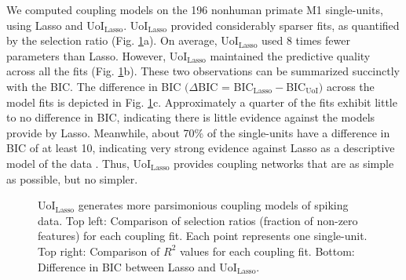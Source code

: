 \documentclass[letterpaper, 10 pt, conference]{ieeeconf}  %
\begin{document}
We computed coupling models on the 196 nonhuman primate M1 single-units, using  Lasso and UoI$_{\text{Lasso}}$. UoI$_{\text{Lasso}}$ provided considerably sparser fits, as quantified by the selection ratio (Fig. \ref{fig:nhp}a). On average, UoI$_{\text{Lasso}}$ used 8 times fewer parameters than Lasso. However, UoI$_{\text{Lasso}}$ maintained the predictive quality across all the fits (Fig. \ref{fig:nhp}b). These two observations can be summarized succinctly with the BIC. The difference in BIC $(\Delta$BIC = BIC$_{\text{Lasso}}-$BIC$_{\text{UoI}})$ across the model fits is depicted in Fig. \ref{fig:nhp}c. Approximately a quarter of the fits exhibit little to no difference in BIC, indicating there is little evidence against the models provide by Lasso.  Meanwhile, about 70\% of the single-units have a difference in BIC of at least 10, indicating very strong evidence against Lasso as a descriptive model of the data \cite{kass1995}. Thus, UoI$_{\text{Lasso}}$ provides coupling networks that are as simple as possible, but no simpler. 
\begin{figure}[t]
    \centering
    \vspace{-15pt}
    \caption{UoI$_{\text{Lasso}}$ generates more parsimonious coupling models of spiking data. Top left: Comparison of selection ratios (fraction of non-zero features) for each coupling fit. Each point represents one single-unit. Top right: Comparison of $R^2$ values for each coupling fit. Bottom: Difference in BIC between Lasso and UoI$_{\text{Lasso}}$.}
    \label{fig:nhp}
\end{figure}
\end{document}
